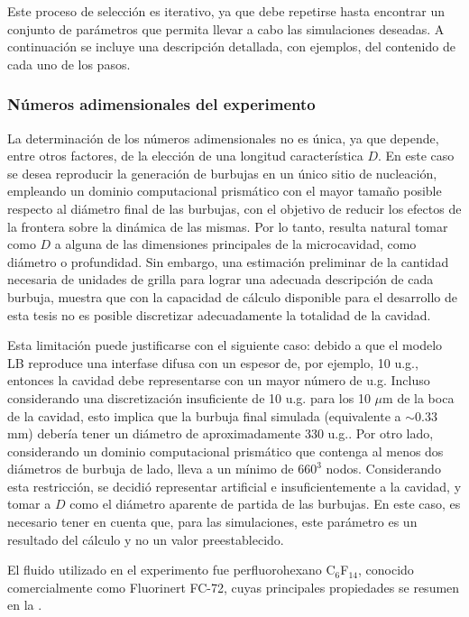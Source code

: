 Este proceso de selecci\'on es iterativo, ya que debe repetirse hasta encontrar un conjunto de par\'ametros que permita llevar a cabo las simulaciones deseadas. A continuaci\'on se incluye una descripci\'on detallada, con ejemplos, del contenido de cada uno de los pasos.


\subsubsection{N\'umeros adimensionales del experimento}

La determinaci\'on de los n\'umeros adimensionales no es \'unica, ya que depende, entre otros factores, de la elecci\'on de una longitud caracter\'istica $D$. En este caso se desea reproducir la generaci\'on de burbujas en un \'unico sitio de nucleaci\'on, empleando un dominio computacional prism\'atico con el mayor tama\~no posible respecto al di\'ametro final de las burbujas, con el objetivo de reducir los efectos de la frontera sobre la din\'amica de las mismas. Por lo tanto, resulta natural tomar como $D$ a alguna de las dimensiones principales de la microcavidad, como di\'ametro o profundidad. Sin embargo, una estimaci\'on preliminar de la cantidad necesaria de unidades de grilla para lograr una adecuada descripci\'on de cada burbuja, muestra que con la capacidad de c\'alculo disponible para el desarrollo de esta tesis no es posible discretizar adecuadamente la totalidad de la cavidad. 

Esta limitaci\'on puede justificarse con el siguiente caso: debido a que el modelo LB reproduce una interfase difusa con un espesor de, por ejemplo, 10 u.g., entonces la cavidad debe representarse con un mayor n\'umero de u.g. Incluso considerando una discretizaci\'on insuficiente de 10 u.g. para los 10 $\mu$m de la boca de la cavidad, esto implica que la burbuja final simulada (equivalente a $\sim 0.33$ mm) deber\'ia tener un di\'ametro de aproximadamente 330 u.g.. Por otro lado, considerando un dominio computacional prism\'atico que contenga al menos dos di\'ametros de burbuja de lado, lleva a un m\'inimo de $660^3$ nodos. Considerando esta restricci\'on, se decidi\'o representar artificial e insuficientemente a la cavidad, y tomar a $D$ como el di\'ametro aparente de partida de las burbujas. En este caso, es necesario tener en cuenta que, para las simulaciones, este par\'ametro es un resultado del c\'alculo y no un valor preestablecido.

\bigskip
El fluido utilizado en el experimento fue perfluorohexano C$_6$F$_{14}$, conocido comercialmente como Fluorinert FC-72, cuyas principales propiedades se resumen en la  \cite{larson_geisler_buoyancy-driven_2007, cao_experimental_2019}. 


